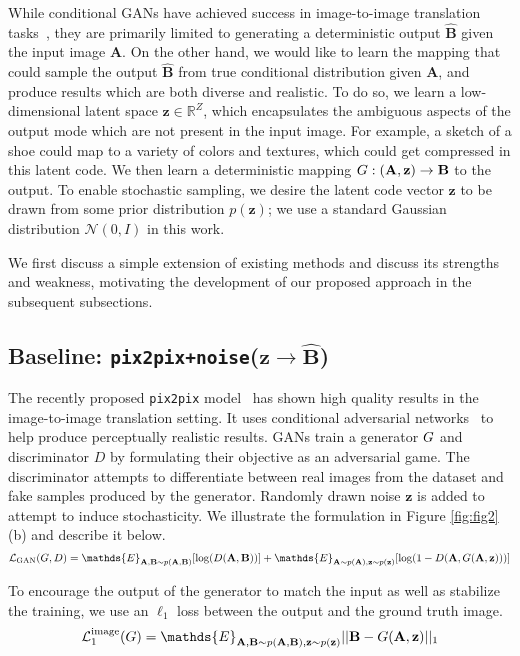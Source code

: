 \documentclass{article}
\newcommand{\pp}{\texttt{pix2pix}\xspace}
\newcommand{\ppn}{\texttt{pix2pix+noise}\xspace}
\newcommand{\D}{D\xspace}
\newcommand{\A}{\mathbf{A}\xspace}
\newcommand{\B}{\mathbf{B}\xspace}
\newcommand{\Bh}{\widehat{\mathbf{B}}\xspace}
\newcommand{\z}{\mathbf{z}\xspace}
\begin{document}
While conditional GANs have achieved success in image-to-image translation tasks~\citep{pathakCVPR16context,sangkloy2017scribbler,xian2017texturegan,yang2016high,isola2016image,zhu2017unpaired}, they are primarily limited to generating a deterministic output $\Bh$ given the input image $\A$. 
On the other hand, we would like to learn the mapping that could sample the output $\Bh$ from true conditional distribution given $\A$, and produce results which are both diverse and realistic.
To do so, we learn a low-dimensional latent space $\z \in \mathds{R}^{Z}$, which encapsulates the ambiguous aspects of the output mode which are not present in the input image. For example, a sketch of a shoe could map to a variety of colors and textures, which could get compressed in this latent code. We then learn a deterministic mapping $\G:(\A,\z)\rightarrow \B$ to the output. To enable stochastic sampling, we desire the latent code vector $\z$ to be drawn from some prior distribution $p(\z)$; we use a standard Gaussian distribution $\mathcal{N}(0,I)$ in this work.

We first discuss a simple extension of existing methods and discuss its strengths and weakness, motivating the development of our proposed approach in the subsequent subsections.

\subsection{Baseline: \ppn ($\z \rightarrow \Bh$)}
The recently proposed \pp model~\citep{isola2016image} has shown high quality results in the image-to-image translation setting.
It uses conditional adversarial networks~\citep{goodfellow2014generative,mirza2014conditional} to help produce perceptually realistic results. GANs train a generator $G$ and discriminator $\D$ by formulating their objective as an adversarial game. The discriminator attempts to differentiate between real images from the dataset and fake samples produced by the generator. Randomly drawn noise $\z$ is added to attempt to induce stochasticity.
We illustrate the formulation in Figure \ref{fig:fig2}(b) and describe it below.
\begin{equation}
\mathcal{L}_{\text{GAN}}(\G,\D) = \mathds{E}_{\A,\B\sim p(\A,\B)}[\log(\D(\A,\B))] + \mathds{E}_{\A\sim p(\A),\z\sim p(\z)}[ \log(1-\D(\A,\G(\A,\z)))]
\label{eqn:Lgan}
\end{equation}

To encourage the output of the generator to match the input as well as stabilize the training, we use an $\ell_1$ loss between the output and the ground truth image.
\begin{equation}
\mathcal{L}_{1}^{\text{image}}(\G) = \mathds{E}_{\A,\B\sim p(\A,\B),\z\sim p(\z)} ||\B - \G(\A,\z) ||_1
\label{eqn:L1}
\end{equation}
\end{document}
